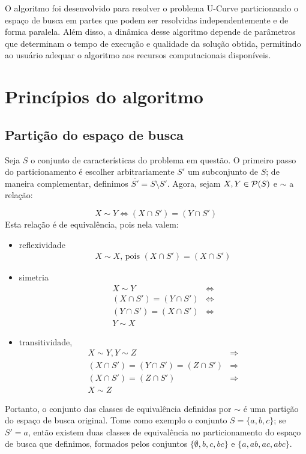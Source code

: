 O algoritmo  foi desenvolvido 
para resolver o problema U-Curve particionando o espaço de busca em 
partes que podem ser resolvidas independentemente e de forma paralela. 
Além disso, a dinâmica desse algoritmo depende de parâmetros que 
determinam o tempo de execução e qualidade da solução obtida, permitindo
ao usuário adequar o algoritmo aos recursos computacionais disponíveis. 

\section{Princípios do algoritmo}
 
\subsection{Partição do espaço de busca}
Seja $S$ o conjunto de características do problema em questão. O 
primeiro passo do particionamento é escolher arbitrariamente $S'$ um 
subconjunto de $S$; de maneira complementar, definimos 
$\overline{S'} = S \setminus S'$. Agora, sejam $X, Y \in \mathcal{P} (S)$
e $\sim$ a relação:

\begin{equation*}
    X \sim Y \iff (X \cap S') = (Y \cap S')
\end{equation*}
Esta relação é de equivalência, pois nela valem:

\begin{itemize}
    \item{reflexividade}
        \begin{align*} 
            X \sim X \text{, pois }
            (X \cap S') = (X \cap S')
        \end{align*} 
    \item{simetria}
        \begin{align*}
            X \sim Y  & \iff \\
            (X \cap S') = (Y \cap S') & \iff \\
            (Y \cap S') = (X \cap S') & \iff \\
            Y \sim X 
        \end{align*}
    \item{transitividade,}
        \begin{align*}
            X \sim Y, Y \sim Z & \Rightarrow \\
            (X \cap S') = (Y \cap S') = (Z \cap S') & \Rightarrow \\
            (X \cap S') = (Z \cap S') & \Rightarrow \\
            X \sim Z
        \end{align*}
\end{itemize}
Portanto, o conjunto das classes de equivalência definidas por $\sim$ é
uma partição do espaço de busca original. Tome como exemplo o conjunto
$S = \{a, b, c\}$; se $S' = {a}$, então existem duas classes de 
equivalência no particionamento do espaço de busca que definimos, 
formados pelos conjuntos $\{\emptyset, b, c, bc\}$ e $\{a, ab, ac, 
abc\}$.

